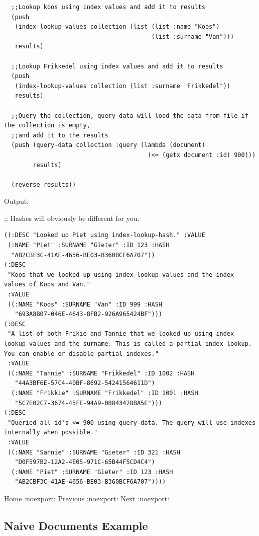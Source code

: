 \documentclass[11pt]{article}
\begin{document}
\begin{verbatim}
  ;;Lookup koos using index values and add it to results
  (push
   (index-lookup-values collection (list (list :name "Koos")
                                         (list :surname "Van")))
   results)

  ;;Lookup Frikkedel using index values and add it to results
  (push
   (index-lookup-values collection (list :surname "Frikkedel"))
   results)

  ;;Query the collection, query-data will load the data from file if the collection is empty,
  ;;and add it to the results
  (push (query-data collection :query (lambda (document)
                                        (<= (getx document :id) 900)))
        results)

  (reverse results))

\end{verbatim}

Output:

;; Hashes will obviously be different for you.

\begin{verbatim}
((:DESC "Looked up Piet using index-lookup-hash." :VALUE
 (:NAME "Piet" :SURNAME "Gieter" :ID 123 :HASH
  "AB2CBF3C-41AE-4656-BE03-B360BCF6A707"))
(:DESC
 "Koos that we looked up using index-lookup-values and the index values of Koos and Van."
 :VALUE
 ((:NAME "Koos" :SURNAME "Van" :ID 999 :HASH
   "693A8B07-046E-4643-8FB2-926A965424BF")))
(:DESC
 "A list of both Frikie and Tannie that we looked up using index-lookup-values and the surname. This is called a partial index lookup. You can enable or disable partial indexes."
 :VALUE
 ((:NAME "Tannie" :SURNAME "Frikkedel" :ID 1002 :HASH
   "44A3BF6E-57C4-40BF-8692-54241564611D")
  (:NAME "Frikkie" :SURNAME "Frikkedel" :ID 1001 :HASH
   "5C7E02C7-3674-45FE-94A9-0B843478BA5E")))
(:DESC
 "Queried all id's <= 900 using query-data. The query will use indexes internally when possible."
 :VALUE
 ((:NAME "Sannie" :SURNAME "Gieter" :ID 321 :HASH
   "D0F597B2-12A2-4E05-971C-65B44F5CD4C4")
  (:NAME "Piet" :SURNAME "Gieter" :ID 123 :HASH
   "AB2CBF3C-41AE-4656-BE03-B360BCF6A707"))))
\end{verbatim}


\href{home.org}{Home} :noexport: \href{basic-example-with-persistence.org}{Previous} :noexport: \href{documents-example.org}{Next} :noexport:
\subsection{Naive Documents Example}
\label{sec:org069272d}
\end{document}
